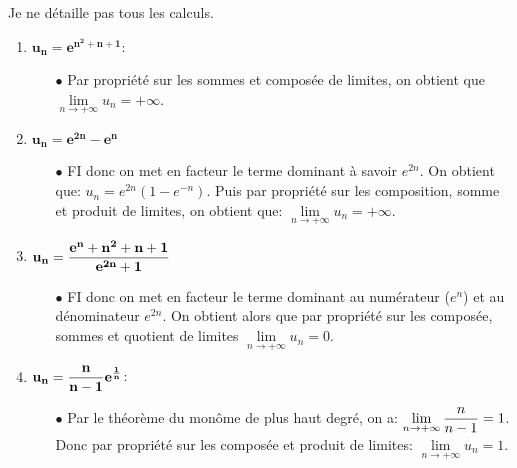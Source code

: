 \documentclass[a4paper, 11pt]{article}
\begin{document}
\begin{correction}  \;
Je ne d\'etaille pas tous les calculs.
\begin{enumerate}
\item  $\mathbf{u_n=e^{n^2+n+1}}$:
\begin{itemize}
\item[$\bullet$]  Par propri\'et\'e sur les sommes et compos\'ee de limites, on obtient que $\lim\limits_{n\to +\infty} u_n=+\infty$.
\end{itemize} 
\item $\mathbf{u_n=e^{2n}-e^n}$
\begin{itemize}
\item[$\bullet$]  FI donc on met en facteur le terme dominant \`{a} savoir $e^{2n}$. On obtient que: $u_n=e^{2n}(1-e^{-n})$. Puis par propri\'et\'e sur les composition, somme et produit de limites, on obtient que: $\lim\limits_{n\to +\infty} u_n=+\infty$.
\end{itemize} 
\item $\mathbf{u_n=\displaystyle\frac{e^n+n^2+n+1}{e^{2n}+1}}$
\begin{itemize}

\item[$\bullet$]  FI donc on met en facteur le terme dominant au num\'erateur ($e^n$) et au d\'enominateur $e^{2n}$. On obtient alors que par propri\'et\'e sur les compos\'ee, sommes et quotient de limites $\lim\limits_{n\to +\infty} u_n=0$. 
\end{itemize} 
\item $\mathbf{u_n=\displaystyle\frac{n}{n-1}e^{\frac{1}{n}}}$:
\begin{itemize}
\item[$\bullet$]  Par le th\'eor\`{e}me du mon\^{o}me de plus haut degr\'e, on a: $\lim\limits_{n\to +\infty} \displaystyle\frac{n}{n-1}=1$. Donc par propri\'et\'e sur les compos\'ee et produit de limites: $\lim\limits_{n\to +\infty} u_n=1$. 
\end{itemize}




\end{enumerate}
\end{correction}
\end{document}
